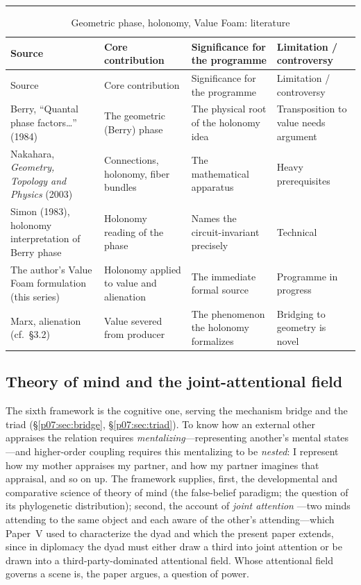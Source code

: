 \documentclass[11pt,a4paper]{article}
\newcommand{\goldrule}{\noindent\textcolor{gold}{\rule{\linewidth}{0.6pt}}\par\vspace{0.4em}}
\newcommand{\xref}[1]{\textcolor{rose}{\S\ref{#1}}}
\newcommand{\pinkref}[1]{\textcolor{rose}{#1}}
\begin{document}
\goldrule
\footnotesize
\begin{longtable}{Y Y Y Y}
\caption{Geometric phase, holonomy, Value Foam: literature}\label{p07:tab:lit-holonomy}\\
\toprule
{}
Source & Core contribution & Significance for the programme & Limitation / controversy \\
\midrule
\endfirsthead
{}
Source & Core contribution & Significance for the programme & Limitation / controversy \\
\midrule
\endhead
Berry, ``Quantal phase factors\ldots'' (1984) & The geometric (Berry) phase & The physical root of the holonomy idea & Transposition to value needs argument \\
Nakahara, \emph{Geometry, Topology and Physics} (2003) & Connections, holonomy, fiber bundles & The mathematical apparatus & Heavy prerequisites \\
Simon (1983), holonomy interpretation of Berry phase & Holonomy reading of the phase & Names the circuit-invariant precisely & Technical \\
The author's Value Foam formulation (this series) & Holonomy applied to value and alienation & The immediate formal source & Programme in progress \\
Marx, alienation (cf.\ \pinkref{§3.2}) & Value severed from producer & The phenomenon the holonomy formalizes & Bridging to geometry is novel \\
\bottomrule
\end{longtable}

\subsection{Theory of mind and the joint-attentional field}
The sixth framework is the cognitive one, serving the mechanism bridge and the triad (\xref{p07:sec:bridge}, \xref{p07:sec:triad}). To know how an external other appraises the relation requires \emph{mentalizing}---representing another's mental states---and higher-order coupling requires this mentalizing to be \emph{nested}: I represent how my mother appraises my partner, and how my partner imagines that appraisal, and so on up. The framework supplies, first, the developmental and comparative science of theory of mind \parencite{premack1978,wimmer1983} (the false-belief paradigm; the question of its phylogenetic distribution); second, the account of \emph{joint attention} \parencite{tomasello2008}---two minds attending to the same object and each aware of the other's attending---which \pinkref{Paper~V} used to characterize the dyad and which the present paper extends, since in diplomacy the dyad must either draw a third into joint attention or be drawn into a third-party-dominated attentional field. Whose attentional field governs a scene is, the paper argues, a question of power.
\end{document}
